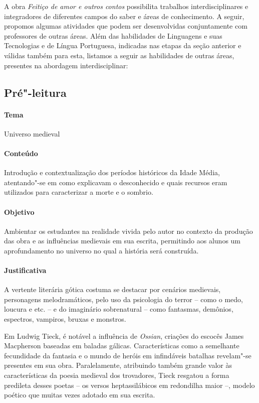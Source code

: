 \documentclass[12pt]{extarticle}
\begin{document}
A obra \emph{Feitiço de amor e outros contos} possibilita trabalhos
interdisciplinares e integradores de diferentes campos do saber e áreas
de conhecimento. A seguir, propomos algumas atividades que podem ser
desenvolvidas conjuntamente com professores de outras áreas. Além das
habilidades de Linguagens e suas Tecnologias e de Língua Portuguesa,
indicadas nas etapas da seção anterior e válidas também para esta,
listamos a seguir as habilidades de outras áreas, presentes na abordagem
interdisciplinar:

\subsection{Pré"-leitura}

\paragraph{Tema} Universo medieval 

\paragraph{Conteúdo} Introdução e contextualização dos períodos históricos
da Idade Média, atentando"-se em como explicavam o desconhecido e quais recursos 
eram utilizados para caracterizar a morte e o sombrio. 

\paragraph{Objetivo} Ambientar os estudantes na realidade vivida pelo autor no contexto 
da produção das obra e as influências medievais em sua escrita, permitindo aos alunos um 
aprofundamento no universo no qual a história será construída.

\paragraph{Justificativa} A vertente literária gótica costuma se destacar por cenários medievais,
personagens melodramáticos, pelo uso da psicologia do terror -- como o medo,
loucura e etc. -- e do imaginário sobrenatural -- como fantasmas,
demônios, espectros, vampiros, bruxas e monstros.

Em Ludwig Tieck, é notável a influência de \textit{Ossian}, criações do escocês James Macpherson 
baseadas em baladas gálicas. Características como a semelhante fecundidade da fantasia e o mundo 
de heróis em infindáveis batalhas revelam"-se presentes em sua obra. Paralelamente, atribuindo 
também grande valor às características da poesia medieval dos trovadores,
Tieck resgatou a forma predileta desses poetas -- os
versos heptassilábicos em redondilha maior --, modelo poético
que muitas vezes adotado em sua escrita.
\end{document}

